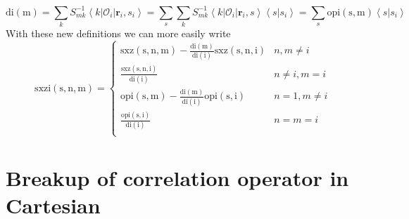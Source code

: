 \documentclass[12pt]{extarticle}
\newcommand{\Oi}{\mathcal{O}_{i}}
\newcommand{\ket}[1]{\left| #1 \right>}
\newcommand{\bra}[1]{\left< #1 \right|}
\newcommand{\braket}[2]{\left< #1 | #2 \right>}
\begin{document}
\begin{equation}
  \mathrm{di(m)} = \sum_k S^{-1}_{mk}\bra{k}\Oi\ket{\mathbf{r}_i,s_i} = \sum_s\sum_k S^{-1}_{mk}\bra{k}\Oi\ket{\mathbf{r}_i,s}\braket{s}{s_i} = \sum_s \mathrm{opi(s,m)}\braket{s}{s_i}
\end{equation}
With these new definitions we can more easily write
\begin{equation}
  \mathrm{sxzi(s,n,m)} = \begin{cases}
  \mathrm{sxz(s,n,m)} - \frac{\mathrm{di(m)}}{\mathrm{di(i)}} \mathrm{sxz(s,n,i)} & n,m \neq i \\
  \frac{\mathrm{sxz(s,n,i)}}{\mathrm{di(i)}} & n \neq i,m = i \\
  \mathrm{opi(s,m)} - \frac{\mathrm{di(m)}}{\mathrm{di(i)}} \mathrm{opi(s,i)} & n=1, m \neq i \\
  \frac{\mathrm{opi(s,i)}}{\mathrm{di(i)}} & n=m=i \\
  \end{cases}
\end{equation}

\section{Breakup of correlation operator in Cartesian}
\end{document}
